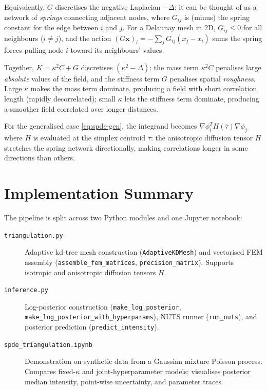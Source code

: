 \documentclass[11pt]{article}
\begin{document}
Equivalently, $G$ discretises the negative Laplacian $-\Delta$: it can be
thought of as a network of \emph{springs} connecting adjacent nodes, where
$G_{ij}$ is (minus) the spring constant for the edge between $i$ and $j$.
For a Delaunay mesh in 2D, $G_{ij} \le 0$ for all neighbours
($i\neq j$), and the action $(G\mathbf{x})_i = -\sum_j G_{ij}(x_j - x_i)$
sums the spring forces pulling node $i$ toward its neighbours' values.

Together, $K = \kappa^2 C + G$ discretises $(\kappa^2 - \Delta)$: the mass
term $\kappa^2 C$ penalises large \emph{absolute} values of the field, and
the stiffness term $G$ penalises spatial \emph{roughness}.  Large $\kappa$
makes the mass term dominate, producing a field with short correlation length
(rapidly decorrelated); small $\kappa$ lets the stiffness term dominate,
producing a smoother field correlated over longer distances.

For the generalised case \eqref{eq:spde-gen}, the integrand becomes
$\nabla\phi_i^T H(\bar\tau) \nabla\phi_j$ where $H$ is evaluated at the
simplex centroid $\bar\tau$: the anisotropic diffusion tensor $H$ stretches
the spring network directionally, making correlations longer in some
directions than others.

\section{Implementation Summary}

The pipeline is split across two Python modules and one Jupyter notebook:

\begin{description}
  \item[\texttt{triangulation.py}] Adaptive kd-tree mesh construction
    (\texttt{AdaptiveKDMesh}) and vectorised FEM assembly
    (\texttt{assemble\_fem\_matrices}, \texttt{precision\_matrix}).
    Supports isotropic and anisotropic diffusion tensors $H$.

  \item[\texttt{inference.py}] Log-posterior construction
    (\texttt{make\_log\_posterior}, \texttt{make\_log\_posterior\_with\_hyperparams}),
    NUTS runner (\texttt{run\_nuts}), and posterior prediction
    (\texttt{predict\_intensity}).

  \item[\texttt{spde\_triangulation.ipynb}] Demonstration on synthetic data from
    a Gaussian mixture Poisson process.  Compares fixed-$\kappa$ and
    joint-hyperparameter models; visualises posterior median intensity,
    point-wise uncertainty, and parameter traces.
\end{description}
\end{document}
